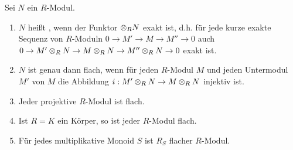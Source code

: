 \documentclass[a4paper, 10pt]{report}
\begin{document}
\begin{DefProp}
\label{1.13}
  Sei $N$ ein $R$-Modul.
  \begin{enumerate}
    \item $N$ hei\ss t , wenn der Funktor $\ten[R] N$ exakt ist,
    d.h. f\"ur jede kurze exakte Sequenz von $R$-Moduln 
    $0\to M'\to M\to M''\to 0$
    auch $0\to M'\ten[R] N\to M\ten[R] N\to M''\ten[R] N\to 0$ exakt ist.
    \item $N$ ist genau dann flach, wenn f\"ur jeden $R$-Modul $M$ und jeden Untermodul $M'$ von $M$
    die Abbildung $i:M'\ten[R] N\to M\ten[R] N$ injektiv ist.
    \item Jeder projektive $R$-Modul ist flach.
    \item Ist $R=K$ ein K\"orper, so ist jeder $R$-Modul flach.
    \item F\"ur jedes multiplikative Monoid $S$ ist $R_S$ flacher $R$-Modul.
  \end{enumerate}
\end{DefProp}
\end{document}
